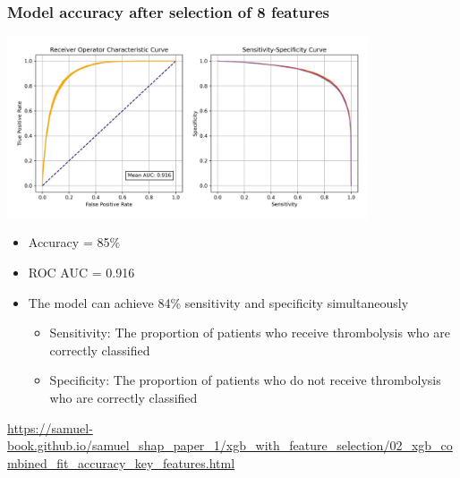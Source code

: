 \documentclass[xcolor={usenames,dvipsnames}]{beamer}
\newcommand{\smallurl}[1]{\textcolor{blue}{\fontsize{4pt}{4.8pt}\selectfont \url{#1}}}
\begin{document}

\begin{frame}
\frametitle{Model accuracy after selection of 8 features}

\vspace{-1em} 

\begin{center}
\includegraphics[width=0.8\textwidth]{./images/model_accuracy_with_8_features}
\end{center}

\vspace{-1em}

\begin{itemize}
    \footnotesize 
    \item Accuracy = 85\%
    \item ROC AUC = 0.916
    \item The model can achieve 84\% sensitivity and specificity simultaneously
    \begin{itemize}
        \tiny
        \item Sensitivity: The proportion of patients who receive thrombolysis who are correctly classified
        \item Specificity: The proportion of patients who do not receive thrombolysis who are correctly classified
    \end{itemize} 
\end{itemize}

\smallurl{https://samuel-book.github.io/samuel_shap_paper_1/xgb_with_feature_selection/02_xgb_combined_fit_accuracy_key_features.html}
\end{frame}



\end{document}
